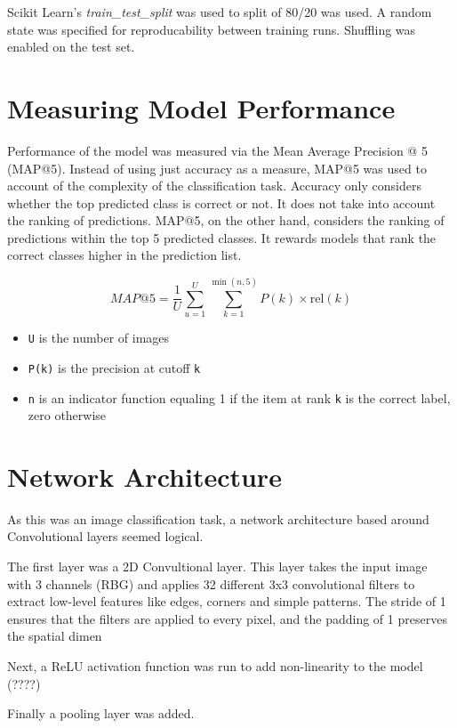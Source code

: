 \documentclass{article}
\begin{document}
Scikit Learn's \emph{train\_test\_split} was used to split of 80/20 was used. A random state was specified for reproducability between training runs. Shuffling was enabled on the test set.

\section{Measuring Model Performance}

Performance of the model was measured via the Mean Average Precision @ 5 (MAP@5). Instead of using just accuracy as a measure, MAP@5 was used to account of the complexity of the
classification task. Accuracy only considers whether the top predicted class is correct or not. It does not take into account the ranking of predictions. 
MAP@5, on the other hand, considers the ranking of predictions within the top 5 predicted classes. It rewards models that rank the correct classes higher in the prediction list.

$$MAP@5 = \frac{1}{U} \sum_{u=1}^{U} \sum_{k=1}^{\min(n,5)} P(k) \times \text{rel}(k)$$

\begin{itemize}
    \item \verb|U| is the number of images 
    \item \verb|P(k)| is the precision at cutoff \verb|k|
    \item \verb|n| is an indicator function equaling 1 if the item at rank \verb|k| is the correct label, zero otherwise
  \end{itemize}


\section{Network Architecture}

As this was an image classification task, a network architecture based around Convolutional layers seemed logical.

The first layer was a 2D Convultional layer. This layer takes the input image with 3 channels (RBG) and applies 32 different 3x3 convolutional filters to
extract low-level features like edges, corners and simple patterns. The stride of 1 ensures that the filters are applied to every pixel, and the 
padding of 1 preserves the spatial dimen 

Next, a ReLU activation function was run to add non-linearity to the model (????)

Finally a pooling layer was added.
\end{document}

